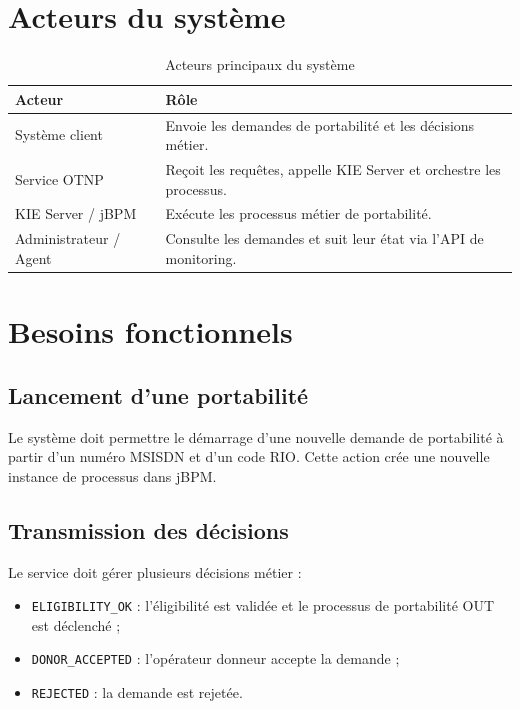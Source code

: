 \documentclass[12pt,a4paper]{report}
\begin{document}
\section{Acteurs du système}
\begin{table}[h]
    \centering
    \begin{tabular}{p{4cm}p{9cm}}
        \toprule
        \textbf{Acteur} & \textbf{Rôle} \\
        \midrule
        Système client & Envoie les demandes de portabilité et les décisions métier. \\
        Service OTNP & Reçoit les requêtes, appelle KIE Server et orchestre les processus. \\
        KIE Server / jBPM & Exécute les processus métier de portabilité. \\
        Administrateur / Agent & Consulte les demandes et suit leur état via l'API de monitoring. \\
        \bottomrule
    \end{tabular}
    \caption{Acteurs principaux du système}
\end{table}

\section{Besoins fonctionnels}
\subsection{Lancement d'une portabilité}
Le système doit permettre le démarrage d'une nouvelle demande de portabilité à partir d'un numéro MSISDN et d'un code RIO. Cette action crée une nouvelle instance de processus dans jBPM.

\subsection{Transmission des décisions}
Le service doit gérer plusieurs décisions métier :
\begin{itemize}
    \item \texttt{ELIGIBILITY\_OK} : l'éligibilité est validée et le processus de portabilité OUT est déclenché ;
    \item \texttt{DONOR\_ACCEPTED} : l'opérateur donneur accepte la demande ;
    \item \texttt{REJECTED} : la demande est rejetée.
\end{itemize}
\end{document}
